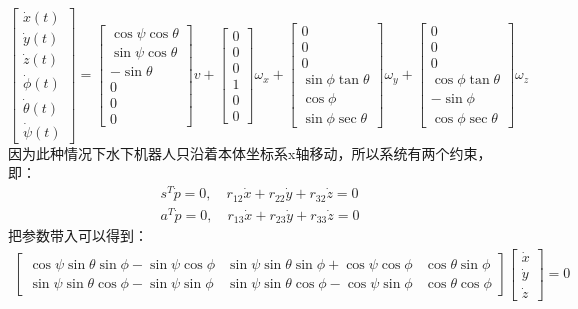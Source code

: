 \begin{equation}
    \begin{bmatrix}\dot{x}(t)\\\dot{y}(t)\\\dot{z}(t)\\\dot{\phi}(t)\\\dot{\theta}(t)\\\dot{\psi}(t)\end{bmatrix}=\begin{bmatrix}\cos\psi\cos\theta\\\sin\psi\cos\theta\\-\sin\theta\\0\\0\\0\end{bmatrix}v+\begin{bmatrix}0\\0\\0\\1\\0\\0\end{bmatrix}\omega_x+\begin{bmatrix}0\\0\\0\\\sin\phi\tan\theta\\\cos\phi\\\sin\phi\sec\theta\end{bmatrix}\omega_y+\begin{bmatrix}0\\0\\0\\\cos\phi\tan\theta\\-\sin\phi\\\cos\phi\sec\theta\end{bmatrix}\omega_z
\end{equation}
因为此种情况下水下机器人只沿着本体坐标系x轴移动，所以系统有两个约束，即：
\begin{equation}
    \begin{aligned}
    s^T\dot{p}=0,\quad r_{12}\dot{x}+r_{22}\dot{y}+r_{32}\dot{z}=0
    \\a^T\dot{p}=0,\quad r_{13}\dot{x}+r_{23}\dot{y}+r_{33}\dot{z}=0
\end{aligned} 
\end{equation}
把参数带入可以得到：
\begin{equation}
    \begin{aligned}
        \begin{bmatrix}\cos \psi\sin \theta\sin \phi-\sin \psi\cos \phi
            &\sin \psi\sin \theta\sin \phi+\cos \psi\cos \phi
            &\cos \theta\sin \phi
            \\\sin \psi\sin \theta\cos \phi-\sin \psi\sin \phi
            &\sin \psi\sin \theta\cos \phi-\cos \psi\sin \phi
            &\cos \theta\cos \phi\end{bmatrix}\begin{bmatrix} \dot{x}
                \\\dot{y}\\\dot{z}
            \end{bmatrix}=0
\end{aligned}     
\end{equation}
